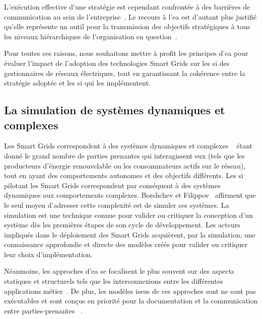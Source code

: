 L'exécution effective d'une stratégie est cependant confrontée à des barrières 
de communication au sein de l'entreprise~\cite{vcater2010factors}. Le recours à 
l'\gls{ea} est d'autant plus justifié qu'elle représente un outil pour la 
transmission des objectifs stratégiques à tous les niveaux hiérarchiques de 
l'organisation en 
question~\cite{kappelman2008enterprise}. 

Pour toutes ces raisons, nous souhaitons mettre à profit les principes 
d'\gls{ea} pour évaluer l'impact de l'adoption des technologies Smart Grids sur 
les \gls{si} des 
gestionnaires de réseaux électriques, tout en garantissant la cohérence entre la 
stratégie adoptée et les \gls{si} qui les implémentent. 



\subsection{La simulation de systèmes dynamiques et complexes}

Les Smart Grids correspondent à des systèmes dynamiques et complexes
~\cite{monti_power_2010} étant donné le grand nombre de parties prenantes qui 
interagissent eux (tels que les producteurs d'énergie renouvelable ou les 
consommateurs actifs sur le réseau), tout en ayant des comportements autonomes 
et des objectifs différents. Les \gls{si} pilotant les  Smart Grids 
correspondent par conséquent à des systèmes dynamiques aux comportements 
complexes. Borshchev et 
Filippov~\cite{borshchev2004system} affirment que le seul moyen d'adresser cette 
complexité est de simuler ces systèmes. La simulation est une technique connue 
pour valider ou critiquer la conception d'un système dès les premières étapes 
de son cycle de développement. Les acteurs impliqués dans le déploiement des 
Smart Grids acquièrent, par la  simulation, une connaissance approfondie et 
directe des modèles créés pour valider ou critiquer leur choix d'implémentation.

Néanmoins, les approches d'\gls{ea} se focalisent le plus souvent sur des 
aspects statiques et structurels tels que les interconnexions entre les 
différentes applications métier~\cite{buckl2008towards}. De plus, les modèles 
issus de ces approches sont ne sont pas exécutables et sont conçus en 
priorité pour la documentation et la communication entre parties-prenantes
~\cite{kulkarni2013modelling}. 



